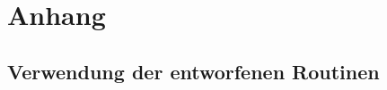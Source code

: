 \documentclass[fleqn, a4paper, 11pt]{article}       %
\begin{document}
%

\newpage
\appendix %
\section{Anhang}
\subsection{Verwendung der entworfenen Routinen \label{A.Man}}
\end{document}
